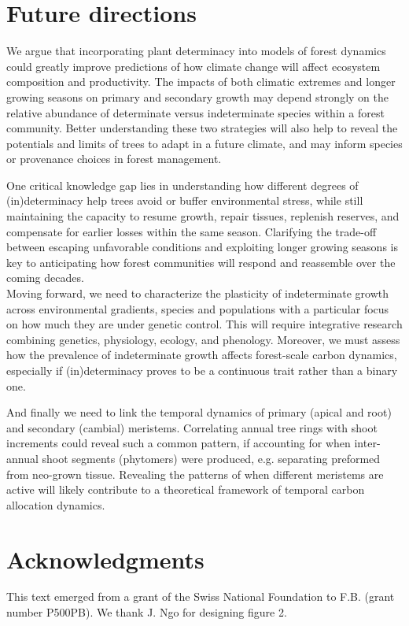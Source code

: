 \documentclass{article}
\begin{document}
	
\section*{Future directions}
We argue that incorporating plant determinacy into models of forest dynamics could greatly improve predictions of how climate change will affect ecosystem composition and productivity. The impacts of both climatic extremes and longer growing seasons on primary and secondary growth may depend strongly on the relative abundance of determinate versus indeterminate species within a forest community. Better understanding these two strategies will also help to reveal the potentials and limits of trees to adapt in a future climate, and may inform species or provenance choices in forest management.

One critical knowledge gap lies in understanding how different degrees of (in)determinacy help trees avoid or buffer environmental stress, while still maintaining the capacity to resume growth, repair tissues, replenish reserves, and compensate for earlier losses within the same season. Clarifying the trade-off between escaping unfavorable conditions and exploiting longer growing seasons is key to anticipating how forest communities will respond and reassemble over the coming decades.\\

Moving forward, we need to characterize the plasticity of indeterminate growth across environmental gradients, species and populations with a particular focus on how much they are under genetic control. 
This will require integrative research combining genetics, physiology, ecology, and phenology. Moreover, we must assess how the prevalence of indeterminate growth affects forest-scale carbon dynamics, especially if (in)determinacy proves to be a continuous trait rather than a binary one. 

And finally we need to link the temporal dynamics of primary (apical and root) and secondary (cambial) meristems. Correlating annual tree rings with shoot increments could reveal such a common pattern, if accounting for when inter-annual shoot segments (phytomers) were produced, e.g. separating preformed from neo-grown tissue. Revealing the patterns of when different meristems are active will likely contribute to a theoretical framework of temporal carbon allocation dynamics.


	


	
\section*{Acknowledgments}
	This text emerged from a grant of the Swiss National Foundation to F.B. (grant number P500PB). We thank J. Ngo for designing figure 2.
	
\end{document}
